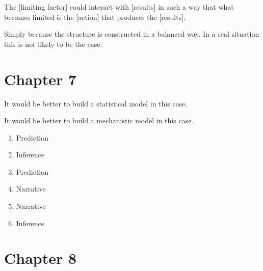 \documentclass[]{memoir}
\begin{document}
The {[}limiting factor{]} could interact with {[}results{]} in such a
way that what becomes limited is the {[}action{]} that produces the
{[}results{]}.


Simply because the structure is constructed in a balanced way. In a real
situation this is not likely to be the case.

\section{Chapter 7}


It would be better to build a statistical model in this case.


It would be better to build a mechanistic model in this case.


\begin{enumerate}
\def\labelenumi{\arabic{enumi}.}
\itemsep1pt\parskip0pt
\item
  Prediction
\item
  Inference
\item
  Prediction
\item
  Narrative
\item
  Narrative
\item
  Inference
\end{enumerate}

\section{Chapter 8}
\end{document}
